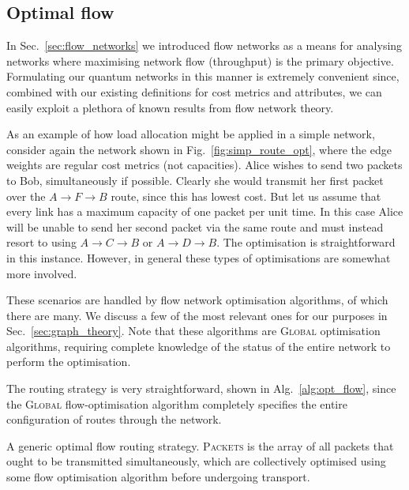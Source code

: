 \documentclass[aps, rmp, twocolumn, amsmath, amssymb, nofootinbib, superscriptaddress, longbibliography, floatfix, table-of-contents, eqsecnum]{revtex4-1}
\begin{document}
%
%

\subsection{Optimal flow} 

In Sec.~\ref{sec:flow_networks} we introduced flow networks as a means for analysing networks where maximising network flow (throughput) is the primary objective. Formulating our quantum networks in this manner is extremely convenient since, combined with our existing definitions for cost metrics and attributes, we can easily exploit a plethora of known results from flow network theory.

As an example of how load allocation might be applied in a simple network, consider again the network shown in Fig.~\ref{fig:simp_route_opt}, where the edge weights are regular cost metrics (not capacities). Alice wishes to send two packets to Bob, simultaneously if possible. Clearly she would transmit her first packet over the \mbox{$A\to F\to B$} route, since this has lowest cost. But let us assume that every link has a maximum capacity of one packet per unit time. In this case Alice will be unable to send her second packet via the same route and must instead resort to using \mbox{$A\to C \to B$} or \mbox{$A\to D\to B$}. The optimisation is straightforward in this instance. However, in general these types of optimisations are somewhat more involved.

These scenarios are handled by flow network optimisation algorithms, of which there are many. We discuss a few of the most relevant ones for our purposes in Sec.~\ref{sec:graph_theory}. Note that these algorithms are \textsc{Global} optimisation algorithms, requiring complete knowledge of the status of the entire network to perform the optimisation.

The routing strategy is very straightforward, shown in Alg.~\ref{alg:opt_flow}, since the \textsc{Global} flow-optimisation algorithm completely specifies the entire configuration of routes through the network.

\begin{table}[!htb]
\caption{A generic optimal flow routing strategy. \textsc{Packets} is the array of all packets that ought to be transmitted simultaneously, which are collectively optimised using some flow optimisation algorithm before undergoing transport.} \label{alg:opt_flow}
\end{table}
\end{document}
